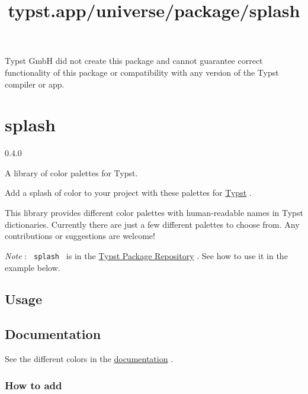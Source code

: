 Typst GmbH did not create this package and cannot guarantee correct
functionality of this package or compatibility with any version of the
Typst compiler or app.


\title{typst.app/universe/package/splash}

\label{banner}
\section{splash}\label{splash}

{ 0.4.0 }

A library of color palettes for Typst.

\label{readme}
Add a splash of color to your project with these palettes for
\href{https://github.com/typst/typst}{Typst} .

This library provides different color palettes with human-readable names
in Typst dictionaries. Currently there are just a few different palettes
to choose from. Any contributions or suggestions are welcome!

\emph{Note} : \texttt{\ splash\ } is in the
\href{https://github.com/typst/packages}{Typst Package Repository} . See
how to use it in the example below.

\subsection{Usage}\label{usage}

\begin{Shaded}
\begin{Highlighting}[]

\end{Highlighting}
\end{Shaded}

\subsection{Documentation}\label{documentation}

See the different colors in the
\href{https://github.com/kaarmu/splash/blob/v0.4.0/doc/main.pdf}{documentation}
.

\subsubsection{How to add}\label{how-to-add}

